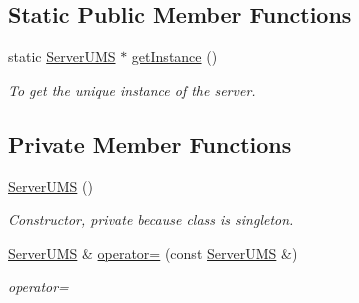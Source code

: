 \subsection*{Static Public Member Functions}
\begin{DoxyCompactItemize}
\item 
\hypertarget{classServerUMS_a5a676fee45bb5f856a6160c61948c5e6}{
static \hyperlink{classServerUMS}{ServerUMS} $\ast$ \hyperlink{classServerUMS_a5a676fee45bb5f856a6160c61948c5e6}{getInstance} ()}
\label{classServerUMS_a5a676fee45bb5f856a6160c61948c5e6}

\begin{DoxyCompactList}\small\item\em To get the unique instance of the server. \item\end{DoxyCompactList}\end{DoxyCompactItemize}
\subsection*{Private Member Functions}
\begin{DoxyCompactItemize}
\item 
\hypertarget{classServerUMS_a89fc4380f08f2cda6044c930d48db2cd}{
\hyperlink{classServerUMS_a89fc4380f08f2cda6044c930d48db2cd}{ServerUMS} ()}
\label{classServerUMS_a89fc4380f08f2cda6044c930d48db2cd}

\begin{DoxyCompactList}\small\item\em Constructor, private because class is singleton. \item\end{DoxyCompactList}\item 
\hypertarget{classServerUMS_ac6dd2c841388e54a78db283792169a06}{
\hyperlink{classServerUMS}{ServerUMS} \& \hyperlink{classServerUMS_ac6dd2c841388e54a78db283792169a06}{operator=} (const \hyperlink{classServerUMS}{ServerUMS} \&)}
\label{classServerUMS_ac6dd2c841388e54a78db283792169a06}

\begin{DoxyCompactList}\small\item\em operator= \item\end{DoxyCompactList}\end{DoxyCompactItemize}
